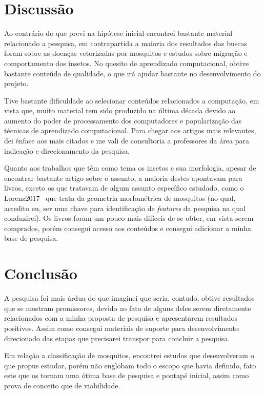 \documentclass[conference]{IEEEtran}
\begin{document}

\section{Discussão}
Ao contrário do que previ na hipótese inicial encontrei bastante material relacionado a pesquisa, em contrapartida a maioria dos resultados das buscas foram sobre as doenças vetorizadas por mosquitos e estudos sobre migração e comportamento dos insetos. No quesito de aprendizado computacional, obtive bastante conteúdo de qualidade, o que irá ajudar bastante no desenvolvimento do projeto.

Tive bastante dificuldade ao selecionar conteúdos relacionados a computação, em vista que, muito material tem sido produzido na última década devido ao aumento do poder de processamento dos computadores e popularização das técnicas de aprendizado computacional. Para chegar aos artigos mais relevantes, dei ênfase aos mais citados e me vali de consultoria a professores da área para indicação e direcionamento da pesquisa.

Quanto aos trabalhos que têm como tema os insetos e sua morfologia, apesar de encontrar bastante artigo sobre o assunto, a maioria destes apontavam para livros, exceto os que tratavam de algum assunto específico estudado, como o Lorenz2017~\cite{Lorenz2017} que trata da geometria morfométrica de mosquitos (no qual, acredito eu, ser uma chave para identificação de \emph{features} da pesquisa na qual conduzirei). Os livros foram um pouco mais difíceis de se obter, em vista serem comprados, porém consegui acesso aos conteúdos e consegui adicionar a minha base de pesquisa.


\section{Conclusão}
A pesquisa foi mais árdua do que imaginei que seria, contudo, obtive resultados que se mostram promissores, devido ao fato de alguns deles serem diretamente relacionados com a minha proposta de pesquisa e apresentarem resultados positivos. Assim como consegui materiais de suporte para desenvolvimento direcionado das etapas que precisarei transpor para concluir a pesquisa.

Em relação a classificação de mosquitos, encontrei estudos que desenvolveram o que propus estudar, porém não englobam todo o escopo que havia definido, fato este que os tornam uma ótima base de pesquisa e pontapé inicial, assim como prova de conceito que de viabilidade. 
\end{document}
